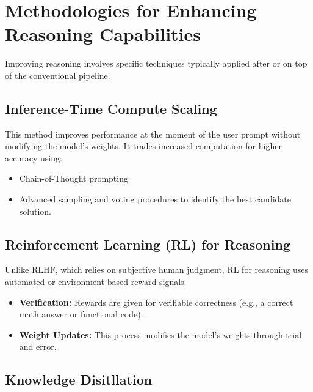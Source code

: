 ﻿\section{Methodologies for Enhancing Reasoning Capabilities}
\label{sec:methodologies-for-enhancing-reasoning-capabilities}


Improving reasoning involves specific techniques typically applied after or on top of the conventional pipeline.

\subsection{Inference-Time Compute Scaling}

This method improves performance at the moment of the user prompt without modifying the model’s weights. It trades increased computation for higher accuracy using:

\begin{itemize}
  \item Chain-of-Thought prompting
  \item Advanced sampling and voting procedures to identify the best candidate solution.
\end{itemize}
  
\subsection{Reinforcement Learning (RL) for Reasoning}

Unlike RLHF, which relies on subjective human judgment, RL for reasoning uses automated or environment-based reward signals.

\begin{itemize}
  \item \textbf{Verification:} Rewards are given for verifiable correctness (e.g., a correct math answer or functional code).
  \item \textbf{Weight Updates:} This process modifies the model's weights through trial and error.
\end{itemize}

\subsection{Knowledge Disitllation}


